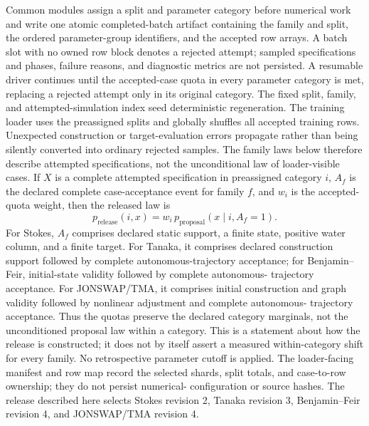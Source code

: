 Common modules assign a split and parameter category before numerical work and
write one atomic completed-batch artifact containing the family and split, the
ordered parameter-group identifiers, and the accepted row arrays.  A batch slot
with no owned row block denotes a rejected attempt; sampled specifications and
phases, failure reasons, and diagnostic metrics are not persisted.  A resumable
driver continues until the accepted-case quota in every parameter category is
met, replacing a rejected attempt only in its original category.  The fixed
split, family, and attempted-simulation index seed deterministic regeneration.
The training loader uses the preassigned splits and globally shuffles all
accepted training rows.  Unexpected construction or target-evaluation errors
propagate rather than being silently converted into ordinary rejected samples.
The family laws below therefore describe attempted specifications, not the
unconditional law of loader-visible cases.  If \(X\) is a complete attempted
specification in preassigned category \(i\), \(A_f\) is the declared complete
case-acceptance event for family \(f\), and \(w_i\) is the accepted-quota
weight, then the released law is
\begin{equation}
  p_{\mathrm{release}}(i,x)
  =w_i\,p_{\mathrm{proposal}}(x\mid i,A_f=1).
  \label{eq:paper-accepted-law}
\end{equation}
For Stokes, \(A_f\) comprises declared static support, a finite state, positive
water column, and a finite target.  For Tanaka, it comprises declared
construction support followed by complete autonomous-trajectory acceptance;
for Benjamin--Feir, initial-state validity followed by complete autonomous-
trajectory acceptance.  For JONSWAP/TMA, it comprises initial construction and
graph validity followed by nonlinear adjustment and complete autonomous-
trajectory acceptance.  Thus the quotas preserve the declared category
marginals, not the unconditioned proposal law within a category.  This is a
statement about how the release is constructed; it does not by itself assert a
measured within-category shift for every family.  No retrospective parameter
cutoff is applied.  The loader-facing manifest and row map record the selected
shards, split totals, and case-to-row ownership; they do not persist numerical-
configuration or source hashes.  The release described here selects Stokes
revision 2, Tanaka revision 3, Benjamin--Feir revision 4, and JONSWAP/TMA
revision 4.

